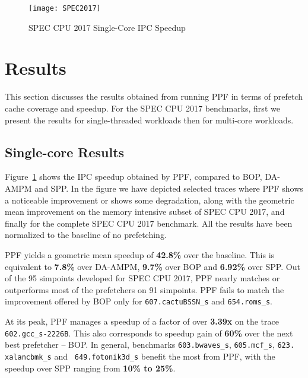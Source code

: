\begin{figure}[ht]
\texttt{[image: SPEC2017]}
\caption{SPEC CPU 2017 Single-Core IPC Speedup}
\label{Fig:SPEC2017_1core}
\end{figure}

\section{Results}
\label{Results}

This section discusses the results obtained from running PPF in terms of
prefetch cache coverage and speedup. For the SPEC CPU 2017 benchmarks, first
we present the results for single-threaded workloads then for multi-core
workloads.

\subsection{Single-core Results}
\label{Results-Single}


Figure~\ref{Fig:SPEC2017_1core} shows the IPC speedup obtained by PPF,
compared to BOP, DA-AMPM and SPP.  In the figure we have depicted selected
traces where PPF shows a noticeable improvement or shows some degradation,
along with the geometric mean improvement on the memory intensive subset of
SPEC CPU 2017, and finally for the complete SPEC CPU 2017 benchmark.  All the
results have been normalized to the baseline of no prefetching.


PPF yields a geometric mean speedup of \textbf{42.8\%} over the baseline. 
This is equivalent to \textbf{7.8\%} over DA-AMPM, \textbf{9.7\%} over BOP 
and \textbf{6.92\%} over SPP.  Out of the 95 simpoints developed for SPEC 
CPU 2017, PPF nearly matches or outperforms most of the prefetchers on 91 
simpoints.  PPF fails to match the improvement offered by BOP only for 
{\tt 607.cactuBSSN\_s} and {\tt 654.roms\_s}.

At its peak, PPF manages a speedup of a factor of over \textbf{3.39x} on the
trace {\tt 602.gcc\_s-2226B}.  This also corresponds to speedup gain of
\textbf{60\%} over the next best prefetcher -- BOP.  In general, benchmarks
{\tt 603.bwaves\_s}, {\tt 605.mcf\_s}, {\tt 623. xalancbmk\_s} and {\tt
649.fotonik3d\_s} benefit the most from PPF, with the speedup over SPP ranging
from \textbf{10\% to 25\%}.


